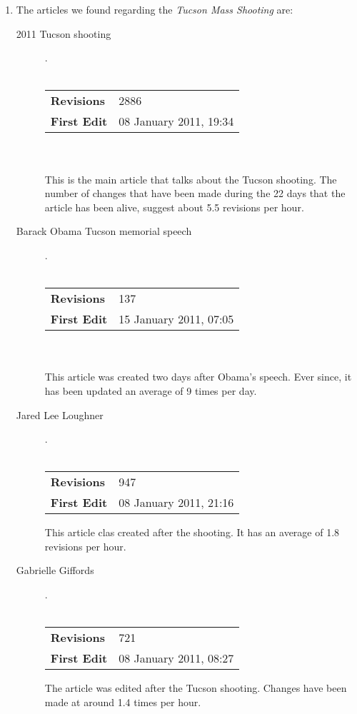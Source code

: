 \documentclass[a4paper,11pt,oneside]{book}
\begin{document}
\begin{enumerate}
	\item The articles we found regarding the {\it Tucson Mass Shooting} are:

		\begin{description}
		\item [2011 Tucson shooting] .\\ \\
			\begin{tabular}{| l || l | } \hline
			  {\bf Revisions} & 2886 \\
			  {\bf First Edit} & 08 January 2011, 19:34 \\\hline
			\end{tabular}\\\\
This is the main article that talks about the Tucson shooting. The number of changes that have been made during the 22 days that the article has been alive, suggest about 5.5 revisions per hour.

		\item[Barack Obama Tucson memorial speech].\\\\
			\begin{tabular}{| l || l | } \hline
			  {\bf Revisions} & 137\\
			  {\bf First Edit} & 15 January 2011, 07:05\\	\hline
			\end{tabular} \\\\
	This article was created two days after Obama's speech. Ever since, it has been updated an average of 9 times per day.

 			\item [Jared Lee Loughner].\\\\
 				\begin{tabular}{| l || l | } \hline
 				  {\bf Revisions} & 947 \\
 				  {\bf First Edit} & 08 January 2011, 21:16 \\ \hline
 				\end{tabular}
	This article clas created after the shooting. It has an average of 1.8 revisions per hour.

 			\item [Gabrielle Giffords]. \\\\
 				\begin{tabular}{| l || l | } \hline
 				  {\bf Revisions} & 721 \\
 				  {\bf First Edit} & 08 January 2011, 08:27  \\	\hline 
 				\end{tabular}
	The article was edited after the Tucson shooting. Changes have been made at around 1.4 times per hour.


\end{description}
\end{enumerate}
\end{document}
